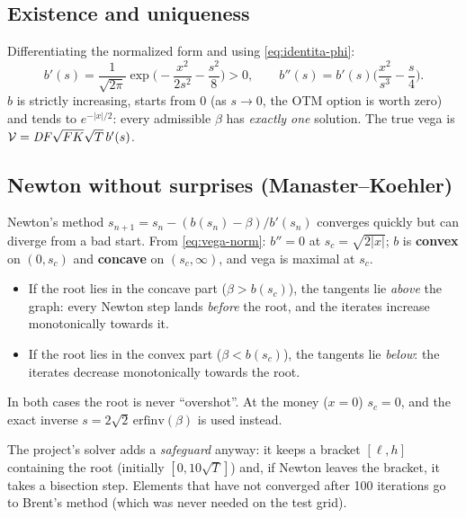 \subsection{Existence and uniqueness}
Differentiating the normalized form and using \eqref{eq:identita-phi}:
\begin{equation}\label{eq:vega-norm}
b'(s)=\frac{1}{\sqrt{2\pi}}\exp\!\Big(-\frac{x^2}{2s^2}-\frac{s^2}{8}\Big)>0,\qquad
b''(s)=b'(s)\Big(\frac{x^2}{s^3}-\frac s4\Big).
\end{equation}
$b$ is strictly increasing, starts from $0$ (as $s\to0$, the OTM option is worth zero) and tends to $e^{-|x|/2}$:
every admissible $\beta$ has \emph{exactly one} solution. The true vega is $\mathcal{V}=\mathit{DF}\sqrt{FK}\sqrt T\,b'(s)$.

\subsection{Newton without surprises (Manaster--Koehler)}
Newton's method $s_{n+1}=s_n-(b(s_n)-\beta)/b'(s_n)$ converges quickly but can diverge from a bad start. From
\eqref{eq:vega-norm}: $b''=0$ at $s_c=\sqrt{2|x|}$; $b$ is \textbf{convex} on $(0,s_c)$ and \textbf{concave} on
$(s_c,\infty)$, and vega is maximal at $s_c$.
\begin{perche}[title={Why start from the inflection point}]
\begin{itemize}
\item If the root lies in the concave part ($\beta>b(s_c)$), the tangents lie \emph{above} the graph: every Newton
step lands \emph{before} the root, and the iterates increase monotonically towards it.
\item If the root lies in the convex part ($\beta<b(s_c)$), the tangents lie \emph{below}: the iterates decrease
monotonically towards the root.
\end{itemize}
In both cases the root is never ``overshot''. At the money ($x=0$) $s_c=0$, and the exact inverse
$s=2\sqrt2\,\mathrm{erfinv}(\beta)$ is used instead.
\end{perche}
The project's solver adds a \emph{safeguard} anyway: it keeps a bracket $[\ell,h]$ containing the root (initially
$[0,10\sqrt T]$) and, if Newton leaves the bracket, it takes a bisection step. Elements that have not converged after
100 iterations go to Brent's method (which was never needed on the test grid).

